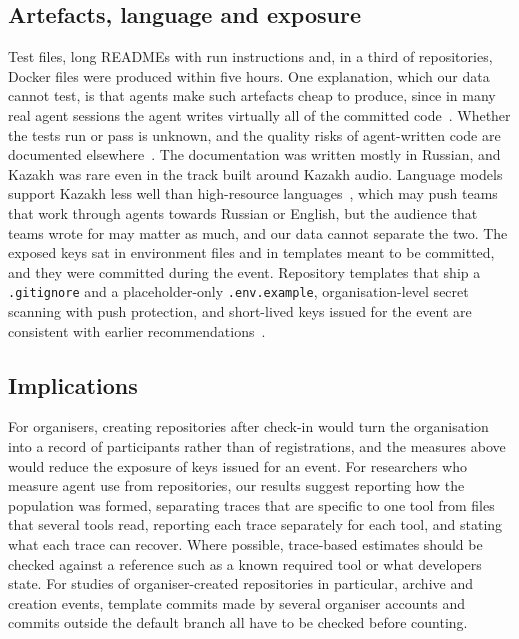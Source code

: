 \documentclass{article}
\begin{document}
\subsection{Artefacts, language and exposure}
Test files, long READMEs with run instructions and, in a third of repositories, Docker files were produced within five hours. One explanation, which our data cannot test, is that agents make such artefacts cheap to produce, since in many real agent sessions the agent writes virtually all of the committed code~\cite{baumann2026swechat}. Whether the tests run or pass is unknown, and the quality risks of agent-written code are documented elsewhere~\cite{he2026cursor,zhao2025vibesafe,deng2026vibeinsecurity}. The documentation was written mostly in Russian, and Kazakh was rare even in the track built around Kazakh audio. Language models support Kazakh less well than high-resource languages~\cite{togmanov2025kazmmlu}, which may push teams that work through agents towards Russian or English, but the audience that teams wrote for may matter as much, and our data cannot separate the two. The exposed keys sat in environment files and in templates meant to be committed, and they were committed during the event. Repository templates that ship a \texttt{.gitignore} and a placeholder-only \texttt{.env.example}, organisation-level secret scanning with push protection, and short-lived keys issued for the event are consistent with earlier recommendations~\cite{meli2019git,krause2022pushed,basak2023tools}.

\subsection{Implications}
For organisers, creating repositories after check-in would turn the organisation into a record of participants rather than of registrations, and the measures above would reduce the exposure of keys issued for an event. For researchers who measure agent use from repositories, our results suggest reporting how the population was formed, separating traces that are specific to one tool from files that several tools read, reporting each trace separately for each tool, and stating what each trace can recover. Where possible, trace-based estimates should be checked against a reference such as a known required tool or what developers state. For studies of organiser-created repositories in particular, archive and creation events, template commits made by several organiser accounts and commits outside the default branch all have to be checked before counting.
\end{document}

